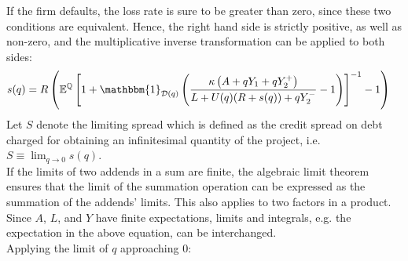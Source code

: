\documentclass[../main.tex]{subfiles}
\begin{document}
        If the firm defaults, the loss rate is sure to be greater than zero,
        since these two conditions are equivalent. 
        Hence, the right hand side is strictly positive, as well as non-zero,
        and the multiplicative inverse transformation can be applied to both sides:
            \begin{align}
                    s(q)
                &=
                    \grossrfrate
                    \left(
                        \mathbb{E}^{\rnmeasure}\left[
                            1
                            +
                            \mathbbm{1}_{\mathcal{D}(q)}
                            \left(
                                \frac{
                                    \kappa 
                                    \left(
                                        A + q Y_{1} + q Y_{2}^{+}
                                    \right)
                                }{
                                    L 
                                    +
                                    U(q)
                                    (\grossrfrate + s(q))
                                    +
                                    q Y_{2}^{-} 
                                }
                                -
                                1
                            \right) 
                        \right]^{-1}
                        - 
                        1
                    \right)
                \nonumber
            \end{align}
        Let $S$ denote the limiting spread which is defined as the credit spread on debt 
        charged for obtaining an infinitesimal quantity of the project, i.e.
        $S \equiv \lim_{q\rightarrow 0} s(q)$.
        \\
        If the limits of two addends in a sum are finite, 
        the algebraic limit theorem ensures that the limit of the summation operation
        can be expressed as the summation of the addends' limits.
        This also applies to two factors in a product.
        Since $A$, $L$, and $Y$ have finite expectations,
        limits and integrals, e.g. the expectation in the above equation, can be interchanged.
        \\
        Applying the limit of $q$ approaching $0$:
\end{document}
